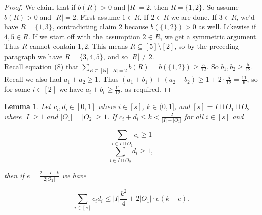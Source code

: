 \documentclass{article}
\newtheorem{lemma}{Lemma}
\begin{document}
\begin{proof}
We claim that if $b(R) > 0$ and $|R| = 2$, then $R = \{1,2\}$. So assume $b(R) > 0$ and $|R| = 2$. First assume $1 \in R$. If $2 \in R$ we are done. If $3 \in R$, we'd have $R = \{1,3\}$, contradicting claim 2 because $b(\{1,2\}) > 0$ as well. Likewise if $4,5 \in R$. If we start off with the assumption $2 \in R$, we get a symmetric argument. Thus $R$ cannot contain $1,2$. This means $R \subseteq [5] \setminus [2]$, so by the preceding paragraph we have $R = \{3,4,5\}$, and so $|R| \neq 2$. \\

Recall equation (8) that $\sum_{R \subseteq [5], |R| = 2} b(R) = b(\{1,2\}) \geq \frac{5}{12}$. So $b_1, b_2 \geq \frac{5}{12}$. Recall we also had $a_1+a_2 \geq 1$. Thus $(a_1+b_1)+(a_2+b_2) \geq 1 + 2 \cdot \frac{5}{12} = \frac{11}{6}$, so for some $i \in [2]$ we have $a_i+b_i \geq \frac{11}{12}$, as required. 
\end{proof}

\begin{lemma}
Let $c_i, d_i \in [0,1]$ where $i \in [s]$, $k \in (0,1]$, and $[s] = I \sqcup O_1 \sqcup O_2$ where $|I| \geq 1$ and $|O_1| = |O_2| \geq 1$. If $c_i + d_i \leq k < \frac{2}{|I|+|O_1|}$ for all $i \in [s]$ and 

$$\sum_{i \in I \sqcup O_1} c_i \geq 1$$ 
$$\sum_{i \in I \sqcup O_2} d_i \geq 1,$$

\noindent
then if $e = \frac{2-|I| \cdot k}{2|O_1|}$ we have 

$$\sum_{i \in [s]} c_id_i \leq |I|\frac{k^2}{4} + 2|O_1| \cdot e(k-e).$$ 
\end{lemma}
\end{document}

